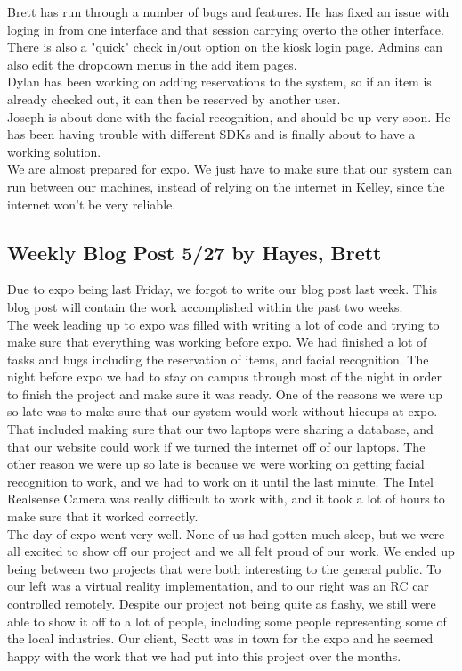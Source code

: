 \documentclass[10pt, onecolumn, twoside, peerreview]{IEEEtran}
\begin{document}
Brett has run through a number of bugs and features. He has fixed an issue with loging in from one interface and that session carrying over​ to the other interface. There is also a "quick" check in/out option on the kiosk login page. Admins can also edit the dropdown menus in the add item pages.\\

Dylan has been working on adding reservations to the system, so if an item is already checked out, it can then be reserved by another user.\\

Joseph is about done with the facial recognition, and should be up very soon. He has been having trouble with different SDKs and is finally about to have a working solution.\\

We are almost prepared for expo. We just have to make sure that our system can run between our machines, instead of relying on the internet in Kelley, since the internet won't be very reliable​.

\subsection{Weekly Blog Post 5/27 by Hayes, Brett}
Due to expo being last Friday, we forgot to write our blog post last week. This blog post will contain the work accomplished within the past two weeks.\\

The week leading up to expo was filled with writing a lot of code and trying to make sure that everything was working before expo. We had finished a lot of tasks and bugs including the reservation of items, and facial recognition. The night before expo we had to stay on campus through most of the night in order to finish the project and make sure it was ready. One of the reasons we were up so late was to make sure that our system would work without hiccups at expo. That included making sure that our two laptops were sharing a database, and that our website could work if we turned the internet off of our laptops. The other reason we were up so late is because we were working on getting facial recognition to work, and we had to work on it until the last minute. The Intel Realsense Camera was really difficult to work with, and it took a lot of hours to make sure that it worked correctly.\\

The day of expo went very well. None of us had gotten much sleep, but we were all excited to show off our project and we all felt proud of our work. We ended up being between two projects that were both interesting to the general public. To our left was a virtual reality implementation, and to our right was an RC car controlled remotely. Despite our project not being quite as flashy, we still were able to show it off to a lot of people, including some people representing some of the local industries. Our client, Scott was in town for the expo and he seemed happy with the work that we had put into this project over the months.\\
\end{document}
